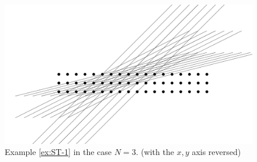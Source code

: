 \begin{figure}[h]
    \centering 
    \includegraphics[width=\textwidth]{images/STEX1_ManimCE_v0.15.1.png}
    \caption{Example \ref{ex:ST-1} in the case $N=3$. (with the $x,y$ axis reversed)}
\end{figure}


